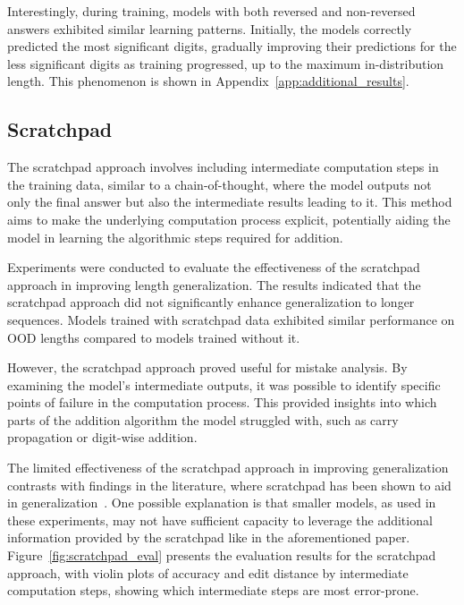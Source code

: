 Interestingly, during training, models with both reversed and non-reversed answers exhibited similar learning patterns. Initially, the models correctly predicted the most significant digits, gradually improving their predictions for the less significant digits as training progressed, up to the maximum in-distribution length. This phenomenon is shown in Appendix~\ref{app:additional_results}.

\subsection{Scratchpad}

The scratchpad approach involves including intermediate computation steps in the training data, similar to a chain-of-thought, where the model outputs not only the final answer but also the intermediate results leading to it. This method aims to make the underlying computation process explicit, potentially aiding the model in learning the algorithmic steps required for addition.

Experiments were conducted to evaluate the effectiveness of the scratchpad approach in improving length generalization. The results indicated that the scratchpad approach did not significantly enhance generalization to longer sequences. Models trained with scratchpad data exhibited similar performance on OOD lengths compared to models trained without it.

However, the scratchpad approach proved useful for mistake analysis. By examining the model's intermediate outputs, it was possible to identify specific points of failure in the computation process. This provided insights into which parts of the addition algorithm the model struggled with, such as carry propagation or digit-wise addition.

The limited effectiveness of the scratchpad approach in improving generalization contrasts with findings in the literature, where scratchpad has been shown to aid in generalization~\parencite{lee_teaching_2023}. One possible explanation is that smaller models, as used in these experiments, may not have sufficient capacity to leverage the additional information provided by the scratchpad like in the aforementioned paper. Figure~\ref{fig:scratchpad_eval} presents the evaluation results for the scratchpad approach, with violin plots of accuracy and edit distance by intermediate computation steps, showing which intermediate steps are most error-prone.

